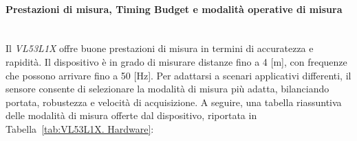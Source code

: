 \documentclass[11pt]{report}
\begin{document}
	\paragraph{\small{Prestazioni di misura, Timing Budget e modalità operative di misura}}\mbox{}\\
	Il \textit{VL53L1X} offre buone prestazioni di misura in termini di accuratezza e rapidità. Il dispositivo è in grado di misurare distanze fino a 4 [m], con frequenze che possono arrivare fino a 50 [Hz].
	Per adattarsi a scenari applicativi differenti, il sensore consente di selezionare la modalità di misura più adatta, bilanciando portata, robustezza e velocità di acquisizione.
	A seguire, una tabella riassuntiva delle modalità di misura offerte dal dispositivo, riportata in Tabella~\ref{tab:VL53L1X. Hardware}:
	\begin{table}[htb]
		\centering
		\caption{VL53L1X. Modalità di misura}
		\label{tab:VL53L1X. Hardware}
	\end{table}
		
\end{document}
